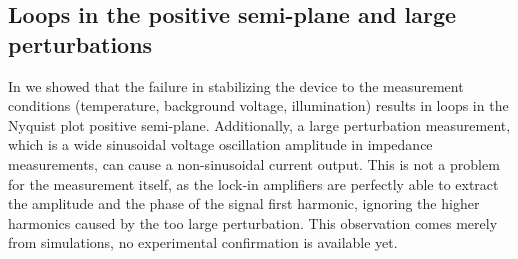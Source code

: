 







\subsection{Loops in the positive semi-plane and large perturbations}\label{impedance-large_perturbations}
In  we showed that the failure in stabilizing the device to the measurement conditions (temperature, background voltage, illumination) results in loops in the Nyquist plot positive semi-plane.
Additionally, a large perturbation measurement, which is a wide sinusoidal voltage oscillation amplitude in impedance measurements, can cause a non-sinusoidal current output.
This is not a problem for the measurement itself, as the lock-in amplifiers are perfectly able to extract the amplitude and the phase of the signal first harmonic, ignoring the higher harmonics caused by the too large perturbation.
This observation comes merely from simulations, no experimental confirmation is available yet.

\begin{figure}
\end{figure}



